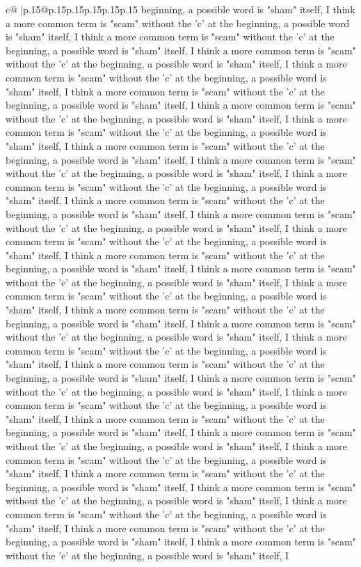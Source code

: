 \documentclass{article}
\begin{document}
{\begin{supertabular}{c@{$\;$}|p{.15\linewidth}@{}p{.15\linewidth}p{.15\linewidth}p{.15\linewidth}p{.15\linewidth}p{.15\linewidth}}
{{{beginning, a possible word is "sham" itself, I think a more common term is "scam" without the 'c' at the beginning, a possible word is "sham" itself, I think a more common term is "scam" without the 'c' at the beginning, a possible word is "sham" itself, I think a more common term is "scam" without the 'c' at the beginning, a possible word is "sham" itself, I think a more common term is "scam" without the 'c' at the beginning, a possible word is "sham" itself, I think a more common term is "scam" without the 'c' at the beginning, a possible word is "sham" itself, I think a more common term is "scam" without the 'c' at the beginning, a possible word is "sham" itself, I think a more common term is "scam" without the 'c' at the beginning, a possible word is "sham" itself, I think a more common term is "scam" without the 'c' at the beginning, a possible word is "sham" itself, I think a more common term is "scam" without the 'c' at the beginning, a possible word is "sham" itself, I think a more common term is "scam" without the 'c' at the beginning, a possible word is "sham" itself, I think a more common term is "scam" without the 'c' at the beginning, a possible word is "sham" itself, I think a more common term is "scam" without the 'c' at the beginning, a possible word is "sham" itself, I think a more common term is "scam" without the 'c' at the beginning, a possible word is "sham" itself, I think a more common term is "scam" without the 'c' at the beginning, a possible word is "sham" itself, I think a more common term is "scam" without the 'c' at the beginning, a possible word is "sham" itself, I think a more common term is "scam" without the 'c' at the beginning, a possible word is "sham" itself, I think a more common term is "scam" without the 'c' at the beginning, a possible word is "sham" itself, I think a more common term is "scam" without the 'c' at the beginning, a possible word is "sham" itself, I think a more common term is "scam" without the 'c' at the beginning, a possible word is "sham" itself, I think a more common term is "scam" without the 'c' at the beginning, a possible word is "sham" itself, I think a more common term is "scam" without the 'c' at the beginning, a possible word is "sham" itself, I think a more common term is "scam" without the 'c' at the beginning, a possible word is "sham" itself, I think a more common term is "scam" without the 'c' at the beginning, a possible word is "sham" itself, I think a more common term is "scam" without the 'c' at the beginning, a possible word is "sham" itself, I think a more common term is "scam" without the 'c' at the beginning, a possible word is "sham" itself, I think a more common term is "scam" without the 'c' at the beginning, a possible word is "sham" itself, I think a more common term is "scam" without the 'c' at the beginning, a possible word is "sham" itself, I think a more common term is "scam" without the 'c' at the beginning, a possible word is "sham" itself, I think a more common term is "scam" without the 'c' at the beginning, a possible word is "sham" itself, I think a more common term is "scam" without the 'c' at the beginning, a possible word is "sham" itself, I }}}
\end{supertabular}}
\end{document}
